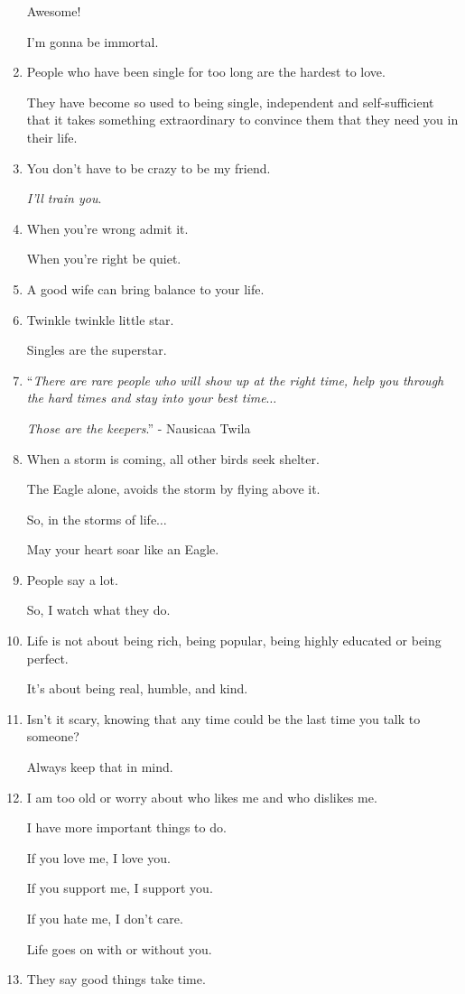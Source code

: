 \documentclass{article}
\begin{document}
\begin{enumerate}
	Awesome!
	
	I'm gonna be immortal.
	\item People who have been single for too long are the hardest to love.
	
	They have become so used to being single, independent and self-sufficient that it takes something extraordinary to convince them that they need you in their life.
	\item You don't have to be crazy to be my friend.
	
	\textit{I'll train you}.
	\item When you're wrong admit it.
	
	When you're right be quiet.
	\item A good wife can bring balance to your life.
	\item Twinkle twinkle little star.
	
	Singles are the superstar.
	\item ``\textit{There are rare people who will show up at the right time, help you through the hard times and stay into your best time$\ldots$}
	
	\textit{Those are the keepers}.'' - Nausicaa Twila
	\item When a storm is coming, all other birds seek shelter.
	
	The Eagle alone, avoids the storm by flying above it.
	
	So, in the storms of life$\ldots$
	
	May your heart soar like an Eagle.
	\item People say a lot.
	
	So, I watch what they do.
	\item Life is not about being rich, being popular, being highly educated or being perfect.
	
	It's about being real, humble, and kind.
	\item Isn't it scary, knowing that any time could be the last time you talk to someone?
	
	Always keep that in mind.
	\item I am too old or worry about who likes me and who dislikes me.
	
	I have more important things to do.
	
	If you love me, I love you.
	
	If you support me, I support you.
	
	If you hate me, I don't care.
	
	Life goes on with or without you.
	\item They say good things take time.
	

\end{enumerate}
\end{document}

